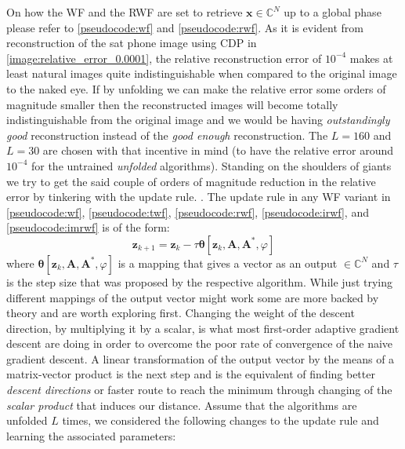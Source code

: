 \noindent On how the \ac{WF}\cite{Candes2014} and the \ac{RWF}\cite{Zhang2016} are set to retrieve $\boldsymbol{x} \in \mathbb{C}^N$ 
up to a global phase please refer to \cref{pseudocode:wf} and \cref{pseudocode:rwf}. As it is evident from reconstruction of the sat phone image 
using \ac{CDP} in \cref{image:relative_error_0.0001}, the relative reconstruction error of $10^{-4}$ 
makes at least natural images quite indistinguishable when compared to the original image to the naked eye. If by unfolding we can make 
the relative error some orders of magnitude smaller then the reconstructed images will become totally indistinguishable from the original image 
and we would be having \emph{outstandingly good} reconstruction instead of the \emph{good enough} reconstruction. The 
$L=160$ and $L=30$ are chosen with that incentive in mind (to have the relative error around $10^{-4}$ for the untrained \emph{unfolded}
algorithms). Standing on the shoulders of giants \cite{Gregor2010} we try to get the said couple of orders of magnitude reduction in the relative 
error by tinkering with the update rule. 
\cite{Gregor2010}. The update rule in any \ac{WF} variant\cite{Liu2019}\cite{Jaganathan2015} in \cref{pseudocode:wf}, \ref{pseudocode:twf}, \ref{pseudocode:rwf}, \ref{pseudocode:irwf}, and \ref{pseudocode:imrwf} is of the form:
\begin{equation}
  \boldsymbol{z}_{k+1} = \boldsymbol{z}_k - \tau\boldsymbol{\theta}[\boldsymbol{z}_k,\boldsymbol{A},\boldsymbol{A^*},\varphi]
\end{equation}
where $\boldsymbol{\theta}[\boldsymbol{z}_k,\boldsymbol{A},\boldsymbol{A^*},\varphi]$ is a mapping that gives a vector as an output 
$\in\mathbb{C}^N$ and $\tau$ is the step size that was proposed by the respective algorithm. While just trying different mappings of the 
output vector might work some are more backed by theory and are worth exploring first. Changing the weight of the 
descent direction, by multiplying it by a scalar, is what most first-order adaptive gradient descent are doing in order to 
overcome the poor rate of convergence of the naive gradient descent. A linear transformation of the output vector by the means of a 
matrix-vector product is the next step and is the equivalent of finding better \emph{descent directions} or 
faster route to reach the minimum through changing of the \emph{scalar product} that induces our distance.
Assume that the algorithms are unfolded $L$ times, 
we considered the following changes to the update rule and learning the associated parameters: 

